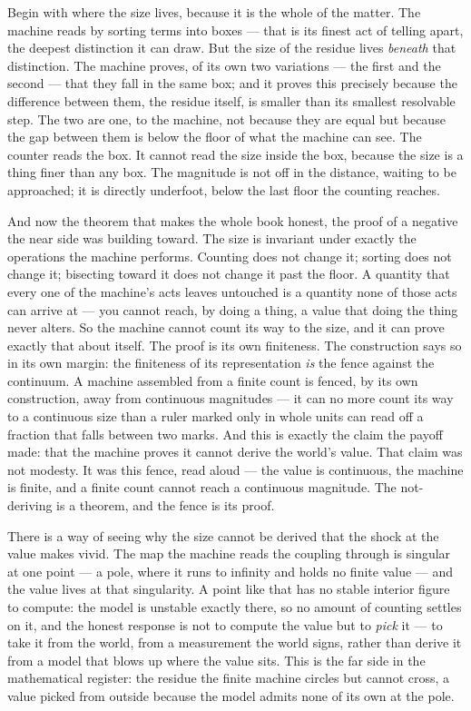 Begin with where the size lives, because it is the whole of the matter. The machine reads by sorting terms into boxes
--- that is its finest act of telling apart, the deepest distinction it can draw. But the size of the residue lives
\emph{beneath} that distinction. The machine proves, of its own two variations --- the first and the second --- that
they fall in the same box; and it proves this precisely because the difference between them, the residue itself, is
smaller than its smallest resolvable step. The two are one, to the machine, not because they are equal but because the
gap between them is below the floor of what the machine can see. The counter reads the box. It cannot read the size
inside the box, because the size is a thing finer than any box. The magnitude is not off in the distance, waiting to
be approached; it is directly underfoot, below the last floor the counting reaches.

And now the theorem that makes the whole book honest, the proof of a negative the near side was building toward. The
size is invariant under exactly the operations the machine performs. Counting does not change it; sorting does not
change it; bisecting toward it does not change it past the floor. A quantity that every one of the machine's acts
leaves untouched is a quantity none of those acts can arrive at --- you cannot reach, by doing a thing, a value that
doing the thing never alters. So the machine cannot count its way to the size, and it can prove exactly that about
itself. The proof is its own finiteness. The construction says so in its own margin: the finiteness of its
representation \emph{is} the fence against the continuum. A machine assembled from a finite count is fenced, by its own
construction, away from continuous magnitudes --- it can no more count its way to a continuous size than a ruler marked
only in whole units can read off a fraction that falls between two marks. And this is exactly the claim the payoff made:
that the machine proves it cannot derive the world's value. That claim was not modesty. It was this fence, read aloud
--- the value is continuous, the machine is finite, and a finite count cannot reach a continuous magnitude. The
not-deriving is a theorem, and the fence is its proof.

There is a way of seeing why the size cannot be derived that the shock at the value makes vivid. The map the machine
reads the coupling through is singular at one point --- a pole, where it runs to infinity and holds no finite value ---
and the value lives at that singularity. A point like that has no stable interior figure to compute: the model is
unstable exactly there, so no amount of counting settles on it, and the honest response is not to compute the value but
to \emph{pick} it --- to take it from the world, from a measurement the world signs, rather than derive it from a model
that blows up where the value sits. This is the far side in the mathematical register: the residue the finite machine
circles but cannot cross, a value picked from outside because the model admits none of its own at the pole.

